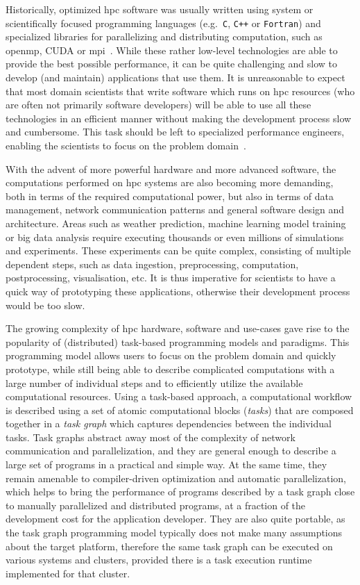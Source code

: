 Historically, optimized \gls{hpc} software was usually written using system or
scientifically focused programming languages (e.g.~\texttt{C}, \texttt{C++}
or \texttt{Fortran}) and specialized libraries for parallelizing and distributing
computation, such as \gls{openmp}, CUDA or \gls{mpi}~\cite{mpistudy}.
While these rather low-level technologies are able to provide the best possible performance, it can
be quite challenging and slow to develop (and maintain) applications that use them. It is
unreasonable to expect that most domain scientists that write software which runs on
\gls{hpc} resources (who are often not primarily software developers) will be able to
use all these technologies in an efficient manner without making the development process slow and
cumbersome. This task should be left to specialized performance engineers, enabling the scientists
to focus on the problem domain~\cite{dace}.

With the advent of more powerful hardware and more advanced software, the computations performed on
\gls{hpc} systems are also becoming more demanding, both in terms of the required
computational power, but also in terms of data management, network communication patterns and
general software design and architecture. Areas such as weather prediction, machine learning model
training or big data analysis require executing thousands or even millions of simulations and
experiments. These experiments can be quite complex, consisting of multiple dependent steps, such
as data ingestion, preprocessing, computation, postprocessing, visualisation, etc. It is thus
imperative for scientists to have a quick way of prototyping these applications, otherwise their
development process would be too slow.

The growing complexity of \gls{hpc} hardware, software and use-cases gave rise to the
popularity of (distributed) task-based programming models and paradigms. This programming model
allows users to focus on the problem domain and quickly prototype, while still being able to
describe complicated computations with a large number of individual steps and to efficiently
utilize the available computational resources. Using a task-based approach, a computational
workflow is described using a set of atomic computational blocks (\emph{tasks}) that are
composed together in a \emph{task graph} which captures dependencies between the individual
tasks. Task graphs abstract away most of the complexity of network communication and
parallelization, and they are general enough to describe a large set of programs in a practical and
simple way. At the same time, they remain amenable to compiler-driven optimization and automatic
parallelization, which helps to bring the performance of programs described by a task graph close
to manually parallelized and distributed programs, at a fraction of the development cost for the
application developer. They are also quite portable, as the task graph programming model typically
does not make many assumptions about the target platform, therefore the same task graph can be
executed on various systems and clusters, provided there is a task execution runtime implemented
for that cluster.

